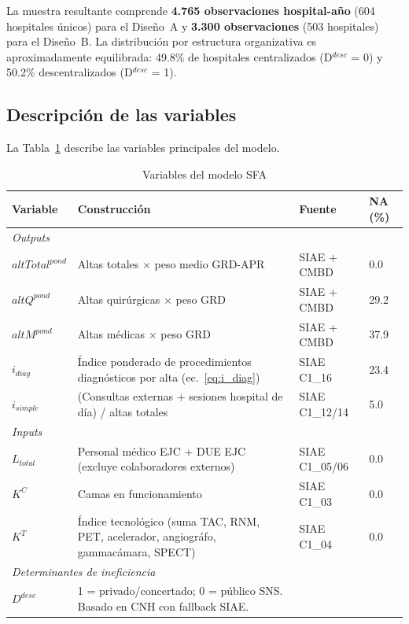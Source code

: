 \documentclass[12pt, a4paper]{article}
\begin{document}
La muestra resultante comprende \textbf{4.765
observaciones hospital-año} (604 hospitales únicos) para
el Diseño~A y \textbf{3.300 observaciones}
(503 hospitales) para el Diseño~B. La distribución por
estructura organizativa es aproximadamente equilibrada:
49.8\% de hospitales centralizados (D$^{desc}$ = 0) y
50.2\% descentralizados (D$^{desc}$ = 1).

\subsection{Descripción de las variables}

La Tabla~\ref{tab:variables} describe las variables
principales del modelo.

\begin{table}[h!]
\centering
\caption{Variables del modelo SFA}
\label{tab:variables}
\begin{threeparttable}
\small
\begin{tabular}{p{2.5cm}p{5cm}p{2.5cm}p{2cm}}
\toprule
\textbf{Variable} & \textbf{Construcción} &
\textbf{Fuente} & \textbf{NA (\%)} \\
\midrule
\multicolumn{4}{l}{\textit{Outputs}} \\
$altTotal^{pond}$ & Altas totales $\times$ peso medio GRD-APR
  & SIAE + CMBD & 0.0 \\
$altQ^{pond}$ & Altas quirúrgicas $\times$ peso GRD
  & SIAE + CMBD & 29.2 \\
$altM^{pond}$ & Altas médicas $\times$ peso GRD
  & SIAE + CMBD & 37.9 \\
$i_{diag}$ & Índice ponderado de procedimientos
  diagnósticos por alta (ec.~\ref{eq:i_diag})
  & SIAE C1\_16 & 23.4 \\
$i_{simple}$ & (Consultas externas + sesiones hospital
  de día) / altas totales
  & SIAE C1\_12/14 & 5.0 \\[4pt]
\multicolumn{4}{l}{\textit{Inputs}} \\
$L_{total}$ & Personal médico EJC + DUE EJC
  (excluye colaboradores externos)
  & SIAE C1\_05/06 & 0.0 \\
$K^C$ & Camas en funcionamiento
  & SIAE C1\_03 & 0.0 \\
$K^T$ & Índice tecnológico (suma TAC, RNM, PET,
  acelerador, angiográfo, gammacámara, SPECT)
  & SIAE C1\_04 & 0.0 \\[4pt]
\multicolumn{4}{l}{\textit{Determinantes de ineficiencia}} \\
$D^{desc}$ & 1 = privado/concertado;
  0 = público SNS. Basado en CNH con fallback SIAE.

\end{tabular}
\end{threeparttable}
\end{table}
\end{document}
